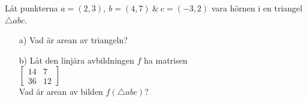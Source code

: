 Låt punkterna $a=(2,3),\ b=(4,7)\ \&\ c=(-3,2)$ vara hörnen i en triangel $\bigtriangleup abc$. 
\begin{itemize}
	\item[a) ] Vad är arean av triangeln?
	\item[b) ] Låt den linjära avbildningen $f$ ha matrisen\\
	$\begin{bmatrix}14&7\\36&12\end{bmatrix}$\\
	Vad är arean av bilden $f(\bigtriangleup abc)$?
\end{itemize} 